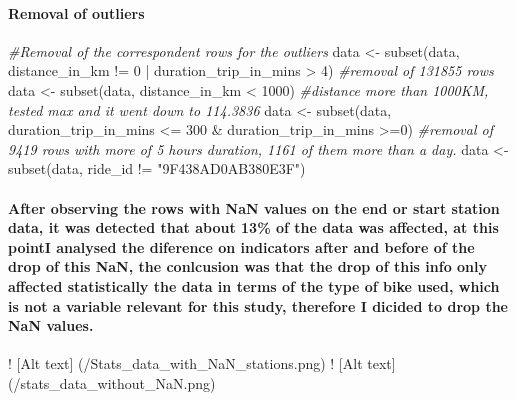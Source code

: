 \documentclass[
]{article}
\newenvironment{Shaded}{\begin{snugshade}}{\end{snugshade}}
\newcommand{\CommentTok}[1]{\textcolor[rgb]{0.56,0.35,0.01}{\textit{#1}}}
\newcommand{\DecValTok}[1]{\textcolor[rgb]{0.00,0.00,0.81}{#1}}
\newcommand{\FunctionTok}[1]{\textcolor[rgb]{0.00,0.00,0.00}{#1}}
\newcommand{\NormalTok}[1]{#1}
\newcommand{\OtherTok}[1]{\textcolor[rgb]{0.56,0.35,0.01}{#1}}
\newcommand{\SpecialCharTok}[1]{\textcolor[rgb]{0.00,0.00,0.00}{#1}}
\newcommand{\StringTok}[1]{\textcolor[rgb]{0.31,0.60,0.02}{#1}}
\begin{document}
\hypertarget{removal-of-outliers}{%
\paragraph{Removal of outliers}\label{removal-of-outliers}}

\begin{Shaded}
\begin{Highlighting}[]
\CommentTok{\#Removal of the correspondent rows for the outliers}
\NormalTok{data }\OtherTok{\textless{}{-}} \FunctionTok{subset}\NormalTok{(data, distance\_in\_km }\SpecialCharTok{!=} \DecValTok{0} \SpecialCharTok{|}\NormalTok{ duration\_trip\_in\_mins }\SpecialCharTok{\textgreater{}} \DecValTok{4}\NormalTok{)     }\CommentTok{\#removal of 131855 rows}
\NormalTok{data }\OtherTok{\textless{}{-}} \FunctionTok{subset}\NormalTok{(data, distance\_in\_km }\SpecialCharTok{\textless{}} \DecValTok{1000}\NormalTok{)  }\CommentTok{\#distance more than 1000KM, tested max and it went down to 114.3836}
\NormalTok{data }\OtherTok{\textless{}{-}} \FunctionTok{subset}\NormalTok{(data, duration\_trip\_in\_mins }\SpecialCharTok{\textless{}=} \DecValTok{300} \SpecialCharTok{\&}\NormalTok{ duration\_trip\_in\_mins }\SpecialCharTok{\textgreater{}=}\DecValTok{0}\NormalTok{) }\CommentTok{\#removal of  9419 rows with more of 5 hours duration, 1161 of them more than a day.}
\NormalTok{data }\OtherTok{\textless{}{-}} \FunctionTok{subset}\NormalTok{(data, ride\_id }\SpecialCharTok{!=} \StringTok{"9F438AD0AB380E3F"}\NormalTok{)}
\end{Highlighting}
\end{Shaded}

\hypertarget{after-observing-the-rows-with-nan-values-on-the-end-or-start-station-data-it-was-detected-that-about-13-of-the-data-was-affected-at-this-pointi-analysed-the-diference-on-indicators-after-and-before-of-the-drop-of-this-nan-the-conlcusion-was-that-the-drop-of-this-info-only-affected-statistically-the-data-in-terms-of-the-type-of-bike-used-which-is-not-a-variable-relevant-for-this-study-therefore-i-dicided-to-drop-the-nan-values.}{%
\paragraph{After observing the rows with NaN values on the end or start
station data, it was detected that about 13\% of the data was affected,
at this pointI analysed the diference on indicators after and before of
the drop of this NaN, the conlcusion was that the drop of this info only
affected statistically the data in terms of the type of bike used, which
is not a variable relevant for this study, therefore I dicided to drop
the NaN
values.}\label{after-observing-the-rows-with-nan-values-on-the-end-or-start-station-data-it-was-detected-that-about-13-of-the-data-was-affected-at-this-pointi-analysed-the-diference-on-indicators-after-and-before-of-the-drop-of-this-nan-the-conlcusion-was-that-the-drop-of-this-info-only-affected-statistically-the-data-in-terms-of-the-type-of-bike-used-which-is-not-a-variable-relevant-for-this-study-therefore-i-dicided-to-drop-the-nan-values.}}

! {[}Alt text{]} (/Stats\_data\_with\_NaN\_stations.png) ! {[}Alt
text{]} (/stats\_data\_without\_NaN.png)
\end{document}
